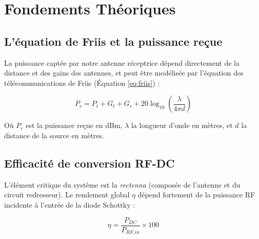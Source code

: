 \section{Fondements Théoriques}
\label{sec:task2}

\subsection{L'équation de Friis et la puissance reçue}
La puissance captée par notre antenne réceptrice dépend directement de la distance et des gains des antennes, et peut être modélisée par l'équation des télécommunications de Friis (Équation \ref{eq:friis}) :

\begin{equation} \label{eq:friis}
    P_{r} = P_{t} + G_{t} + G_{r} + 20\log_{10}\left(\frac{\lambda}{4\pi d}\right)
\end{equation}

Où $P_r$ est la puissance reçue en dBm, $\lambda$ la longueur d'onde en mètres, et $d$ la distance de la source en mètres.

\subsection{Efficacité de conversion RF-DC}
L'élément critique du système est la \textit{rectenna} (composée de l'antenne et du circuit redresseur). Le rendement global $\eta$ dépend fortement de la puissance RF incidente à l'entrée de la diode Schottky :

\begin{equation} \label{eq:rendement}
    \eta = \frac{P_{DC}}{P_{RF\_in}} \times 100
\end{equation}